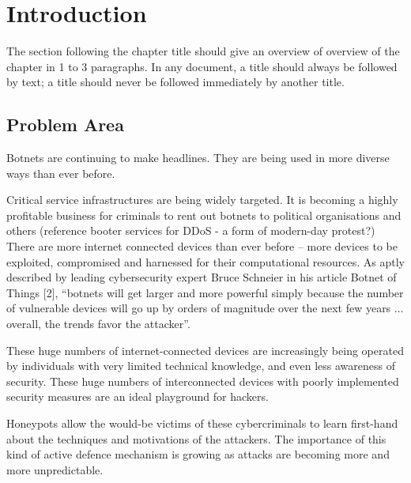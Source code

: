 \chapter{Introduction}

The section following the chapter title should give an overview of overview of the chapter in 1 to 3 paragraphs. In any document, a title should always be followed by text; a title should never be followed immediately by another title.


\section{Problem Area}



Botnets are continuing to make headlines. They are being used in more diverse ways than ever
before.

Critical service infrastructures are being widely targeted. It is becoming a highly profitable business
for criminals to rent out botnets to political organisations and others (reference booter services for
DDoS - a form of modern-day protest?)
There are more internet connected devices than ever before – more devices to be exploited,
compromised and harnessed for their computational resources. As aptly described by leading
cybersecurity expert Bruce Schneier in his article Botnet of Things [2], “botnets will get larger and
more powerful simply because the number of vulnerable devices will go up by orders of magnitude
over the next few years ... overall, the trends favor the attacker”.

These huge numbers of internet-connected devices are increasingly being operated by individuals
with very limited technical knowledge, and even less awareness of security. These huge numbers of
interconnected devices with poorly implemented security measures are an ideal playground for
hackers.

Honeypots allow the would-be victims of these cybercriminals to learn first-hand about the
techniques and motivations of the attackers. The importance of this kind of active defence
mechanism is growing as attacks are becoming more and more unpredictable.

